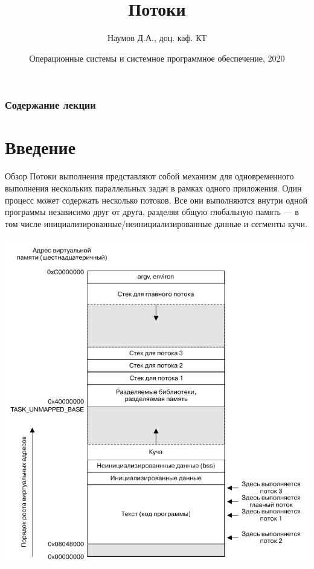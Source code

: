 \documentclass{beamer}
\title[Язык C]{Потоки}
\author{Наумов Д.А., доц. каф. КТ}
\date[14.10.2019] {Операционные системы и системное программное обеспечение, 2020}
\begin{document}
\begin{frame}
  \titlepage
\end{frame}
  
\begin{frame}
  \frametitle{Содержание лекции}
  \tableofcontents  
\end{frame}

\section{Введение}

\begin{frame}{Обзор}
    Потоки выполнения представляют собой механизм для одновременного выполнения нескольких параллельных задач в рамках одного приложения. Один процесс может содержать несколько потоков. Все они выполняются внутри одной программы независимо друг от друга, разделяя общую глобальную память — в том числе инициализированные/неинициализированные данные и сегменты кучи.
\end{frame}

\begin{frame}{}
    \centering
    \includegraphics[scale=0.4]{memory_layout.png}
\end{frame}
\end{document}
